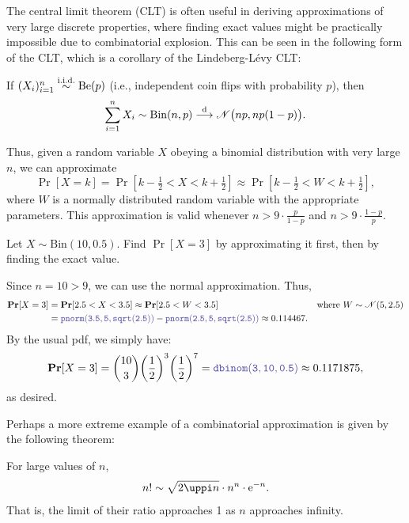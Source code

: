 The central limit theorem (CLT) is often useful in deriving approximations of very large discrete properties, where finding exact values might be practically impossible due to combinatorial explosion. 
This can be seen in the following form of the CLT, which is a corollary of the Lindeberg-L\'evy CLT: 

\begin{theorem}
    If \((X_i)_{i=1}^n \stackrel{\mathrm{i.i.d.}}{\sim} \mathrm{Be}(p)\) (i.e., independent coin flips with probability \(p\)), then\[\sum_{i=1}^n X_i \sim \mathrm{Bin}(n,p) \overset{\mathrm{d}}{\longrightarrow} \mathscr{N}\big(np,np(1-p)\big).\]
\end{theorem}

Thus, given a random variable \(X\) obeying a binomial distribution with very large \(n\), we can approximate\[
\Pr[X=k] = \Pr[k-\tfrac{1}{2} < X < k +\tfrac{1}{2}] \approx \Pr[k-\tfrac{1}{2} < W < k + \tfrac{1}{2}], 
\]where \(W\) is a normally distributed random variable with the appropriate parameters.
This approximation is valid whenever \(n> 9\cdot\frac{p}{1-p}\) and \(n> 9\cdot\frac{1-p}{p}\). 

\begin{example}
    Let \(X\sim \mathrm{Bin}(10, 0.5)\). Find \(\Pr[X=3]\) by approximating it first, then by finding the exact value. 

    Since \(n = 10 > 9\), we can use the normal approximation. Thus,\begin{align*}
        \Pr[X=3] &= \Pr[2.5 <X < 3.5] \approx \Pr[2.5<W<3.5] &\text{where}~W\sim\mathscr{N}(5,2.5) \\ 
        &= \code{pnorm(3.5, 5, sqrt(2.5))}- \code{pnorm(2.5, 5, sqrt(2.5))} \approx 0.114467. 
    \end{align*}By the usual pdf, we simply have:\[
    \Pr[X=3] = \binom{10}{3} {\biggl(\frac{1}{2}\biggr)}^3{\biggl(\frac{1}{2}\biggr)}^7 = \code{dbinom(3,10,0.5)} \approx 0.1171875,
    \]as desired. 
\end{example}

\vspace{10pt}
Perhaps a more extreme example of a combinatorial approximation is given by the following theorem:
\begin{theorem}
    For large values of \(n\),\[
    n! \sim \sqrt{2\uppi n}\cdot n^n \cdot\e^{-n}.\]
    That is, the limit of their ratio approaches 1 as \(n\) approaches infinity. 
\end{theorem}

